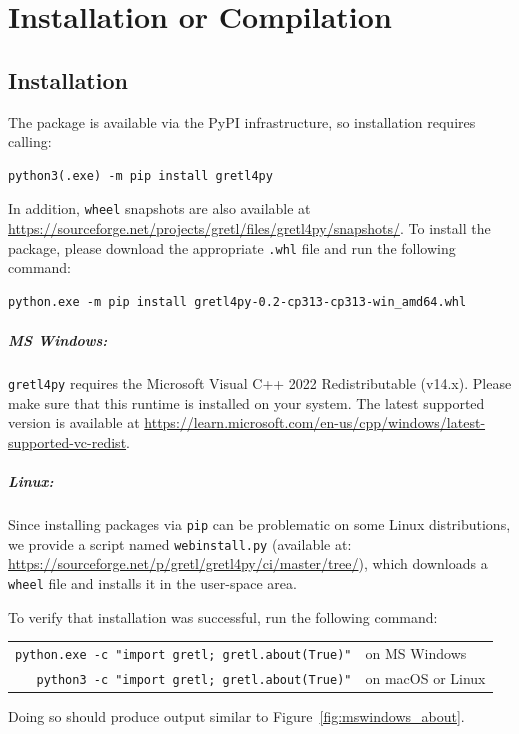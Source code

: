 \chapter{Installation or Compilation}
\section{Installation}\label{sec:install}

The \gretlpy package is available
via the PyPI infrastructure, so installation requires calling:
\begin{verbatim}
python3(.exe) -m pip install gretl4py
\end{verbatim}

In addition, \texttt{wheel} snapshots are also available at
\url{https://sourceforge.net/projects/gretl/files/gretl4py/snapshots/}.
To install the package, please download the appropriate \texttt{.whl}
file and run the following command:

\begin{verbatim}
python.exe -m pip install gretl4py-0.2-cp313-cp313-win_amd64.whl
\end{verbatim}

\paragraph{MS Windows:}
\texttt{gretl4py} requires the Microsoft Visual C++ 2022 Redistributable
(v14.x). Please make sure that this runtime is installed on your system.
The latest supported version is available at
\url{https://learn.microsoft.com/en-us/cpp/windows/latest-supported-vc-redist}.

\paragraph{Linux:}
Since installing packages via \texttt{pip} can be problematic on some
Linux distributions, we provide a script named \texttt{webinstall.py}
(available at: \url{https://sourceforge.net/p/gretl/gretl4py/ci/master/tree/}),
which downloads a \texttt{wheel} file and installs it in the user-space area.

To verify that installation was successful, run the following command:
\begin{center}
\begin{tabular}{rl}
  \hline
  \texttt{python.exe -c "import gretl; gretl.about(True)"} & on MS
                                                             Windows \\
  \texttt{python3 -c "import gretl; gretl.about(True)"} & on macOS or Linux\\
  \hline
\end{tabular}
\end{center}
Doing so should produce output similar to Figure~\ref{fig:mswindows_about}.

